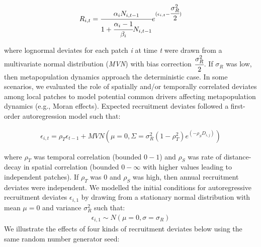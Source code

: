 \documentclass[
]{article}
\begin{document}
\begin{align}
R_{i,t}=\cfrac{\alpha_iN_{i,t-1}}{1+\cfrac{\alpha_i-1}{\beta_i}N_{i,t-1}}e^{(\epsilon_{i,t}-\cfrac{\sigma_{R}^2}{2})}
\end{align}

where lognormal deviates for each patch \emph{i} at time \emph{t} were
drawn from a multivariate normal distribution (\emph{MVN}) with bias
correction \(\cfrac{\sigma_{R}^2}{2}\). If \(\sigma_R\) was low, then
metapopulation dynamics approach the deterministic case. In some
scenarios, we evaluated the role of spatially and/or temporally
correlated deviates among local patches to model potential common
drivers affecting metapopulation dynamics (e.g., Moran effects).
Expected recruitment deviates followed a first-order autoregression
model such that:

\begin{align}
\epsilon_{i,t}=\rho_T\epsilon_{t-1}+MVN(\mu=0,\Sigma=\sigma_R^2(1-\rho_T^2)e^{(-\rho_SD_{i,j})})
\end{align}

where \(\rho_T\) was temporal correlation (bounded \(0-1\)) and
\(\rho_S\) was rate of distance-decay in spatial correlation (bounded
\(0-\infty\) with higher values leading to independent patches). If
\(\rho_T\) was 0 and \(\rho_S\) was high, then annual recruitment
deviates were independent. We modelled the initial conditions for
autoregressive recruitment deviates \(\epsilon_{i,1}\) by drawing from a
stationary normal distribution with mean \(\mu=0\) and variance
\(\sigma_R^2\) such that: \begin{align}
\epsilon_{i,1} \sim N(\mu=0,\sigma=\sigma_R)
\end{align} We illustrate the effects of four kinds of recruitment
deviates below using the same random number generator seed:
\end{document}
